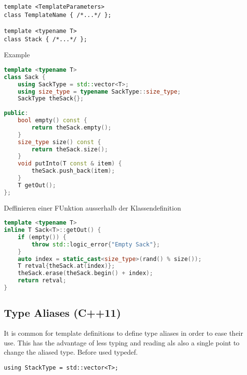 \begin{lstlisting}
template <TemplateParameters>
class TemplateName { /*...*/ };

template <typename T>
class Stack { /*...*/ };
\end{lstlisting}

Example
\begin{lstlisting}[language=C++]
template <typename T>
class Sack {
	using SackType = std::vector<T>;
	using size_type = typename SackType::size_type;
	SackType theSack{};
	
public:
	bool empty() const {
		return theSack.empty();
	}
	size_type size() const {
		return theSack.size();
	}
	void putInto(T const & item) {
		theSack.push_back(item);
	}
	T getOut();
};
\end{lstlisting}
Deffinieren einer FUnktion ausserhalb der Klassendefinition
\begin{lstlisting}[language=C++]
template <typename T> 
inline T Sack<T>::getOut() {
	if (empty()) {
		throw std::logic_error{"Empty Sack"}; 
	} 
	auto index = static_cast<size_type>(rand() % size()); 
	T retval{theSack.at(index)};
	theSack.erase(theSack.begin() + index);
	return retval;
}
\end{lstlisting}

\subsection{Type Aliases (C++11)}
It is common for template definitions to define type aliases in order to ease their use. This has the advantage of less typing and reading als also a single point to change the aliased type. Before used typedef.

\begin{lstlisting}
using StackType = std::vector<T>;
\end{lstlisting}






\pagebreak
